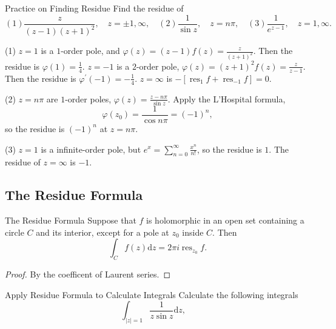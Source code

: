 \begin{example}{Practice on Finding Residue}{}
  Find the residue of
  \begin{equation}
    (1) \frac{z}{(z-1)(z+1)^2}, \quad z = \pm 1, \infty, \quad
    (2) \frac{1}{\sin z}, \quad z = n \pi, \quad
    (3) \frac{1}{e^{z-1}}, \quad z = 1, \infty.
  \end{equation}
\end{example}

\begin{solution}
  (1) $z = 1$ is a $1$-order pole, and $\varphi(z) = (z-1)f(z)= \frac{z}{(z+1)^2}$.
  Then the residue is $\varphi(1) = \frac{1}{4}$.
  $z = -1$ is a $2$-order pole, $\varphi(z) = (z+1)^2f(z) = \frac{z}{z-1}$.
  Then the residue is $\varphi^{\prime}(-1) = - \frac{1}{4}$.
  $z = \infty$ is $- [\operatorname{res}_1f + \operatorname{res}_{-1}f] = 0$.

  (2) $z = n\pi$ are $1$-order poles, $\varphi(z) = \frac{z - n\pi}{\sin z}$.
  Apply the L'Hospital formula,
  \begin{equation}
    \varphi(z_0) = \frac{1}{\cos n\pi } = (-1)^n,
  \end{equation}
  so the residue is $(-1)^n$ at $z = n \pi$.

  (3) $z = 1$ is a infinite-order pole, but $e^x = \sum _{n = 0}^{\infty} \frac{x^n}{n!}$,
  so the residue is $1$.
  The residue of $z = \infty$ is $-1$.
\end{solution}

\subsection{The Residue Formula}

\begin{theorem}{The Residue Formula}{}
  Suppose that $f$ is holomorphic in an open set containing a circle $C$
  and its interior, except for a pole at $z_0$ inside $C$. Then
  \begin{equation}
    \int_C f(z)\mathrm{d} z
    =
    2 \pi i\operatorname{res}_{z_0} f.
  \end{equation}
\end{theorem}

\begin{proof}
  By the coefficent of Laurent series.
\end{proof}

\begin{example}{Apply Residue Formula to Calculate Integrals}{}
  Calculate the following integrals
  \begin{equation}
    \int_{|z| = 1} \frac{1}{z \sin z}\mathrm{d} z, \quad
  \end{equation}
\end{example}

